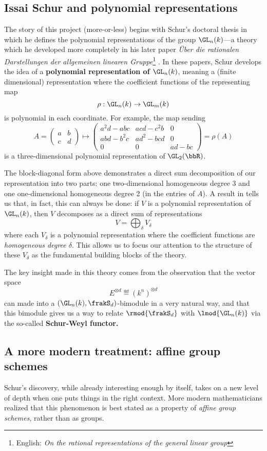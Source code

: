\documentclass[12pt]{article}
\begin{document}
\subsection{Issai Schur and polynomial representations}
The story of this project (more-or-less) begins with Schur's doctoral thesis \cite{schur-thesis} in which he defines
the polynomial representations of the group $\GL_n(k)$---a theory which he developed more completely in his later paper \textit{\"Uber die 
rationalen Darstellungen der allgemeinen linearen Gruppe}\footnote{English: \textit{On the rational representations of the general linear group}}
\cite{schur-rational}. In these papers, Schur develops the idea of a \textbf{polynomial representation of $\GL_n(k)$},
meaning a (finite dimensional) representation where the coefficient functions of the representing map 
\[\rho:\GL_n(k)\to \GL_m(k)\]
is polynomial in each coordinate. For example, the map sending 
\[A=\begin{pmatrix}
	a&b\\
	c&d
\end{pmatrix}\mapsto \begin{pmatrix}
	a^2d-abc & acd-c^2b & 0\\
	abd-b^2c & ad^2-bcd & 0\\
	0 & 0 & ad-bc
\end{pmatrix}=\rho(A)\]
is a three-dimensional polynomial representation of $\GL_2(\bbR)$.

The block-diagonal form above demonstrates a direct sum decomposition of our representation into two parts: one two-dimensional homogeneous degree 3
and one one-dimensional homogeneous degree 2 (in the entries of $A$). A result in \cite{schur-thesis} tells us that, in fact, this can always be done: 
if $V$ is a polynomial representation of $\GL_n(k)$,
then $V$ decomposes as a direct sum of representations 
\[V=\bigoplus_\delta V_\delta\]
where each $V_\delta$ is a polynomial representation where the coefficient functions are \textit{homogeneous degree $\delta$}. 
This allows us to focus our attention to the structure of these $V_\delta$ as the fundamental building blocks of the theory.

The key insight made in this theory comes from the observation that the vector space 
\[E^{\otimes d}\eqdef (k^n)^{\otimes d}\]
can made into a $(\GL_n(k),\frakS_d)$-bimodule in a very natural way, and that this bimodule gives us a way to relate 
$\rmod {\frakS_d}$ with $\lmod {\GL_n(k)}$ via the so-called \textbf{Schur-Weyl functor.}

\subsection{A more modern treatment: affine group schemes}
Schur's discovery, while already interesting enough by itself, takes on a new level of depth when one puts 
things in the right context. More modern mathematicians realized that this phenomenon is best stated as a property of \textit{affine group schemes}, rather than as groups. 
\end{document}
